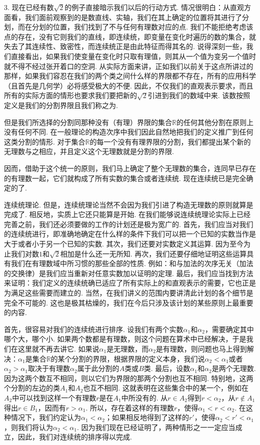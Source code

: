\documentclass[color=cyan,mathpazo,titlestyle=hang]{elegantbook_mac}
\begin{document}
3. 现在已经有数$\sqrt{2}$的例子直接暗示我们以后的行动方式. 情况很明白：从直观方面看，我们面前观察到的是数直线、实轴，我们在其上确定的位置将其进行了分划，而在分划的位置，我们找到了不与任何有理数对应的点. 我们不能拒绝考虑该点的存在，没有它则我们的直线，即连续统，即变量在变化时遍历的数的集合，就失去了其连续性、致密性，而连续统正是由此特征而得其名的. 说得深刻一些，我们直接看出，如果我们使变量在变化时只取有理值，则其从一个值为变另一个值时就不得不经过张开着口的空洞. 从实际方面来讲，正如我们以前关于这点所讲过的那样，如果我们容忍在我们的两个类之间什么样的界限都不存在，所有的应用科学（且首先是几何学）必将感受极大的不便. 因此，不仅我们的直观表示要求，而且所有的实际方面的情形也要求我们要把新的$\sqrt{2}$引进到我们的数域中来. 该数按照定义是我们的分割界限且我们称之为.

但是我们所选择的分割同那种没有（有理）界限的集合$\mathbb{R}$的任何其他分割在原则上没有任何不同. 在一般理论的构造次序中我们因此自然地把我们的定义推广到任何这类分割的情形. 对于集合$\mathbb{R}$的每一个没有有理界限的分割，我们都提出某个新的无理数与之相应，并且定义这个无理数就是分割的界限. 

因而，借助于这个统一的原则，我们马上确定了整个无理数的集合，连同早已存在的有理数一起，它们就构成了所有实数的集合或者连续统. 现在连续统已是完全确定的了. 

\textsf{连续统理论}. 但是，连续统理论当然不会因为我们引进了构造无理数的原则就算是完成了. 相反地，实质上它还只能算是开始. 在我们能够说连续统理论实际上已经完善之前，我们还必须要做的工作的计划还是极为宽广的. 首先，我们应当对我们的连续统进行，即准确地确定在什么样的条件下我们可以把一个已知的实数当作是大于或者小于另一个已知的实数. 其次，我们还要对实数定义其运算. 因为至今为止我们对数$1$和$\sqrt{2}$相加是什么还一无所知. 再次，我们还要仔细地证明这些运算具有我们在有理数域中所习惯的那些全部的性质. 例如：和与加法的次序无关（加法的交换律）是我们应当重新对任意实数加以证明的定理. 最后，我们应当找到方法来证明：我们定义的连续统确已适应了所有实际上的和直观表示的需要，它也正是为满足这些需要而建立的. 当然，在我们讲义的范围内要讲清此计划的各个细节是完全不可能的. 这也是极其枯燥的，我们在今后只涉及该计划的某些原则上最重要的内容. 

首先，很容易对我们的连续统进行排序. 设我们有两个实数$\alpha_1$和$\alpha_2$，需要确定其中哪个大，哪个小. 如果两个数都是有理数，则这个问题在算术中已经解决，于是我们在这里就不再去讲它. 如果说$\alpha_1$是无理数，而$\alpha_2$是有理数，则问题也马上得到解决：$\alpha_1$是集合$\mathbb{R}$的某个分割的界限，根据界限的定义本身，我们说$\alpha_2<\alpha_1$或者$\alpha_2>\alpha_1$取决于有理数$\alpha_2$属于此分割的$A$类或$B$类. 最后，设数$\alpha_1$和$\alpha_2$是两个无理数. 因为这两个数互不相同，则以它们为界限的那两个分割也互不相同. 特别地，这两个分割的左边的类$A_1$和$A_2$也互不相同. 这就表明在这些集合中的某一个，例如在$A_2$中可以找到这样一个有理数$r$是在$A_1$中所没有的. 从$r\in A_2$得到$r<\alpha_2$，从$r\notin A_1$得出$r\in B_1$，因而有$r>\alpha_1$. 所以，存在着这样的有理数$r$，使得$\alpha_1<r<\alpha_2$. 在这种情况下，我们约定认为$\alpha_1<\alpha_2$；如果相反地得到了这样的$r'$，使得$\alpha_2<r'<\alpha_1$，则我们将认为$\alpha_2<\alpha_1$. 因为我们现在已经证明了，两种情形之一一定应当成立，因此，我们对连续统的排序得以完成. 
\end{document}
